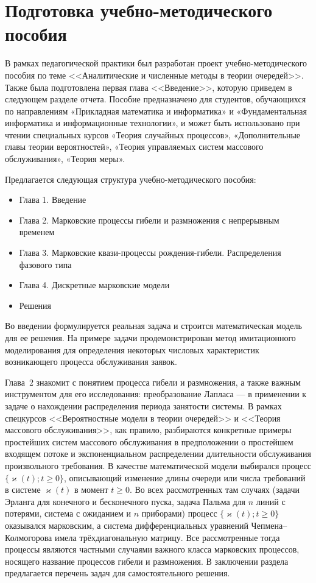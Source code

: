 \documentclass[14pt]{extarticle}
\theoremstyle{theorem}
\theoremstyle{remark}
\begin{document}
\newpage
\section{Подготовка учебно-методического пособия}
В рамках педагогической практики был разработан проект учебно-методического пособия по теме <<Аналитические и численные методы в теории очередей>>. Также была подготовлена первая глава <<Введение>>, которую приведем в следующем разделе отчета. Пособие предназначено для студентов, обучающихся по направлениям «Прикладная математика и информатика» и «Фундаментальная информатика и информационные технологии», и может быть использовано при чтении специальных курсов «Теория случайных процессов», «Дополнительные главы теории вероятностей», «Теория управляемых систем массового обслуживания», «Теория меры».

Предлагается следующая структура учебно-методического пособия:
\begin{itemize}
    \item Глава 1. Введение
    \item Глава 2. Марковские процессы гибели и размножения с непрерывным временем
    \item Глава 3. Марковские квази-процессы рождения-гибели. Распределения фазового типа
    \item Глава 4. Дискретные марковские модели
    \item Решения
\end{itemize}

Во введении формулируется реальная задача и строится математическая модель для ее решения. На примере задачи продемонстрирован метод имитационного моделирования для определения некоторых числовых характеристик возникающего процесса обслуживания заявок. 

Глава~2 знакомит с понятием процесса гибели и размножения, а также важным инструментом для его исследования: преобразование Лапласа --- в применении к задаче о нахождении распределения периода занятости системы. В рамках спецкурсов <<Вероятностные модели в теории очередей>> и <<Теория
массового обслуживания>>, как правило, разбираются конкретные примеры простейших систем
массового обслуживания в предположении о простейшем входящем потоке и
экспоненциальном распределении длительности обслуживания произвольного
требования. В качестве математической модели выбирался процесс $\{\varkappa(t);
t\geqslant0\}$, описывающий изменение длины очереди или числа требований в
системе $\varkappa(t)$ в момент $t\geqslant0$. Во всех рассмотренных там случаях
(задачи Эрланга для конечного и бесконечного пуска, задача Пальма для $n$ линий
с потерями, система с ожиданием и $n$ приборами) процесс $\{\varkappa(t);
t\geqslant0\}$ оказывался марковским, а система дифференциальных уравнений
Чепмена--Колмогорова имела трёхдиагональную матрицу. Все рассмотренные тогда
процессы являются частными случаями важного класса марковских процессов,
носящего название процессов гибели и размножения. В заключении раздела предлагается перечень задач для самостоятельного решения.
\end{document}
